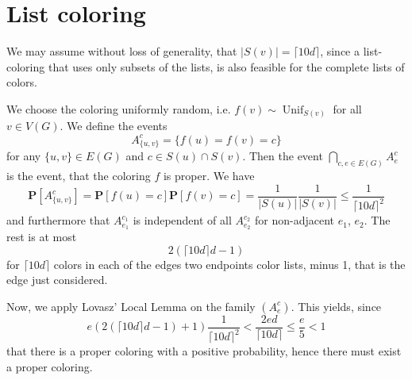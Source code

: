 \documentclass{scrartcl}
\renewcommand\P{\mathbf{P}}
\newcommand\1{\mathbf{1}}
\begin{document}
\section{List coloring}
We may assume without loss of generality, that $\lvert S(v)\rvert = \lceil 10d\rceil$, since a list-coloring that uses only subsets of the lists, is also feasible for the complete lists of colors.

We choose the coloring uniformly random, i.e. $f (v) \sim \operatorname{Unif}_{S(v)}$ for all $v \in V(G)$. We define the events
\[
A_{\{u,v\}}^c = \{f(u)=f(v)=c\}
\]
for any $\{u,v\}\in E(G)$ and $c \in S(u)\cap S(v)$. Then the event $\bigcap_{c, e \in E(G)} A^c_e$ is the event, that the coloring $f$ is proper. We have
\[
\P[A_{\{u,v\}}^c] = \P[f(u)=c] \P[f(v) = c] = \frac{1}{\lvert S(u)\rvert}\frac{1}{\lvert S(v)\rvert} \le \frac{1}{\lceil 10d\rceil^2}
\]
and furthermore that $A_{e_1}^{c_1}$ is independent of all $A_{e_2}^{c_2}$ for non-adjacent $e_1$, $e_2$. The rest is at most
\[
2(\lceil 10d\rceil d-1)
\]
for $\lceil 10d\rceil$ colors in each of the edges two endpoints color lists, minus 1, that is the edge just considered. 

Now, we apply Lovasz' Local Lemma on the family $(A_e^c)$. This yields, since
\[
e(2(\lceil 10d\rceil d-1)+1)\frac{1}{\lceil 10d\rceil^2} < \frac{2ed}{\lceil 10d\rceil} \le \frac{e}{5} < 1
\]
that there is a proper coloring with a positive probability, hence there must exist a proper coloring.
\end{document}
